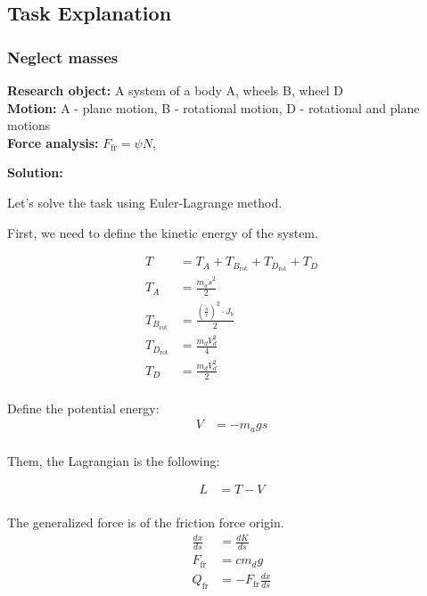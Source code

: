 \documentclass{article}
\begin{document}
\subsection{Task Explanation}

\subsubsection{Neglect masses}

\textbf{Research object:} A system of a body A, wheels B, wheel D\\
\textbf{Motion:} A - plane motion, B - rotational motion, D - rotational and plane motions\\
\textbf{Force analysis:} $F_\text{fr} = \psi N$, 

\textbf{Solution:}

Let's solve the task using Euler-Lagrange method. 

First, we need to define the kinetic energy of the system. 

\begin{align*}
  T &= T_A + T_{B_{\text{rot}}} + T_{D_{\text{rot}}} + T_D \\
  T_A &= \frac{m_a \dot{s}^2}{2} \\
  T_{B_{\text{rot}}} &= \frac{(\frac{\dot{s}}{r})^2 \cdot J_b}{2} \\
  T_{D_{\text{rot}}} &= \frac{m_d V_d^2}{4} \\
  T_D &= \frac{m_d V_d^2}{2} \\
\end{align*}
  
Define the potential energy:
\begin{align*}
  V &= -m_a g s \\
\end{align*}

Them, the Lagrangian is the following:

\begin{align*}
  L &= T - V \\
\end{align*}

The generalized force is of the friction force origin. 
\begin{align*}
  \frac{dx}{ds} &= \frac{dK}{ds} \\
  F_{\text{fr}} &= c m_d g \\
  Q_{\text{fr}} &= -F_{\text{fr}} \frac{dx}{ds} \\
\end{align*}
\end{document}
